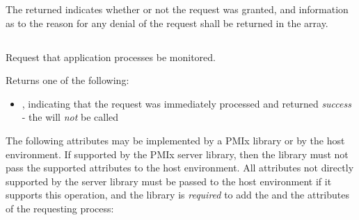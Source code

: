 The returned  indicates whether or not the request was granted, and information as to the reason for any denial of the request shall be returned in the  array.

\subsection{}

\summary

Request that application processes be monitored.

\format


\begin{arglist}
\end{arglist}

Returns one of the following:

\returnsimplenb

\returnstart
\begin{itemize}
    \item {}, indicating that the request was immediately processed and returned \textit{success} - the  will \textit{not} be called
\end{itemize}
\returnend

\optattrstart
The following attributes may be implemented by a \ac{PMIx} library or by the host environment. If supported by the \ac{PMIx} server library, then the library must not pass the supported attributes to the host environment. All attributes not directly supported by the server library must be passed to the host environment if it supports this operation, and the library is \textit{required} to add the  and the  attributes of the requesting process:

